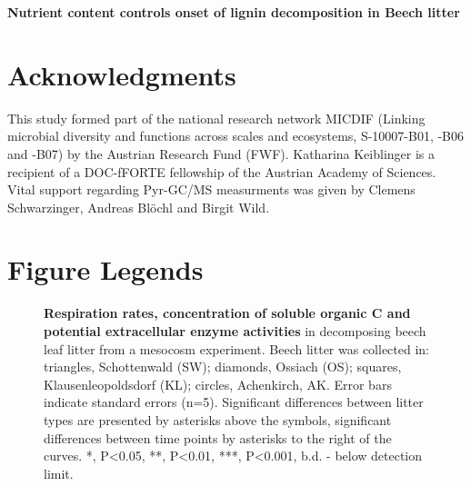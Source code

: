 \documentclass[10pt]{article}
\date{}
\begin{document}
\begin{flushleft}
{\Large
\textbf{Nutrient content controls onset of lignin decomposition in Beech litter}
}
\\

\newpage


\linenumbers %
\newpage%





\section*{Acknowledgments}
This study formed part of the national research network MICDIF (Linking microbial diversity and functions across scales and ecosystems, S-10007-B01, -B06 and -B07) by the Austrian Research Fund (FWF). Katharina Keiblinger is a recipient of a DOC-fFORTE fellowship of the Austrian Academy of Sciences. Vital support regarding Pyr-GC/MS measurments was given by Clemens Schwarzinger, Andreas Bl\"{o}chl and Birgit Wild.



\newpage
\section*{Figure Legends}

\begin{figure}[!h]
\begin{center}
\end{center}
\caption{
{\bf Respiration rates, concentration of soluble organic C and potential extracellular enzyme activities} in decomposing beech leaf litter from a mesocosm experiment. Beech litter was collected in: triangles, Schottenwald (SW); diamonds, Ossiach (OS); squares, Klausenleopoldsdorf (KL); circles, Achenkirch, AK. Error bars indicate standard errors (n=5). Significant differences between litter types are presented by asterisks above the symbols, significant differences between time points by asterisks to the right of the curves. *, P\textless 0.05, **, P\textless 0.01, ***, P\textless 0.001, b.d. - below detection limit.}
\label{fig:enz}
\end{figure}


\end{flushleft}
\end{document}
